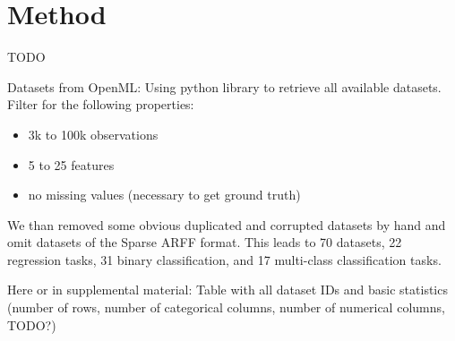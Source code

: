 

\section{Method}

TODO










Datasets from OpenML:
Using  python library to retrieve all available datasets. Filter for the following properties:
\begin{itemize}
	\item 3k to 100k observations
	\item 5 to 25 features
	\item no missing values (necessary to get ground truth)
\end{itemize}

We than removed some obvious duplicated and corrupted datasets by hand and omit datasets of the Sparse ARFF format. This leads to 70 datasets, 22 regression tasks, 31 binary classification, and 17 multi-class classification tasks.

Here or in supplemental material: Table with all dataset IDs and basic statistics (number of rows, number of categorical columns, number of numerical columns, TODO?)


